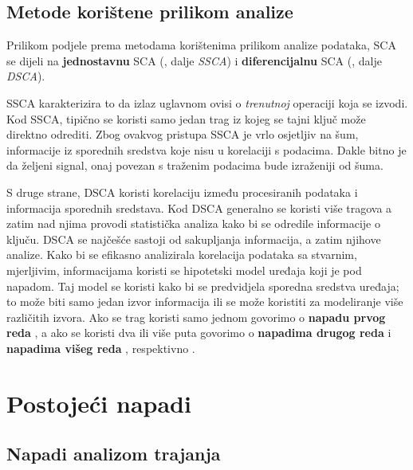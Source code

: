 \documentclass[times, utf8, diplomski]{fer}
\begin{document}
\subsection{Metode korištene prilikom analize}

Prilikom podjele prema metodama korištenima prilikom analize podataka, SCA se dijeli na \textbf{jednostavnu} SCA (, dalje \emph{SSCA}) i \textbf{diferencijalnu} SCA (, dalje \emph{DSCA}).

SSCA karakterizira to da izlaz uglavnom ovisi o \emph{trenutnoj} operaciji koja se izvodi. Kod SSCA, tipično se koristi samo jedan trag  iz kojeg se tajni ključ može direktno odrediti. Zbog ovakvog pristupa SSCA je vrlo osjetljiv na šum, informacije iz sporednih sredstva koje nisu u korelaciji s podacima. Dakle bitno je da željeni signal, onaj povezan s traženim podacima bude izraženiji od šuma.

S druge strane, DSCA koristi korelaciju između procesiranih podataka i informacija sporednih sredstava. Kod DSCA generalno se koristi više tragova a zatim nad njima provodi statistička analiza kako bi se odredile informacije o ključu. DSCA se najčešće sastoji od sakupljanja informacija, a zatim njihove analize. Kako bi se efikasno analizirala korelacija podataka sa stvarnim, mjerljivim, informacijama koristi se hipotetski model uređaja koji je pod napadom. Taj model se koristi kako bi se predvidjela sporedna sredstva uređaja; to može biti samo jedan izvor informacija ili se može koristiti za modeliranje više različitih izvora. Ako se trag koristi samo jednom govorimo o \textbf{napadu prvog reda} , a ako se koristi dva ili više puta govorimo o \textbf{napadima drugog reda}  i \textbf{napadima višeg reda} , respektivno \citep{zhou2005side}.

\section{Postojeći napadi} \label{sec:known_attacks}

\subsection{Napadi analizom trajanja}
\end{document}
